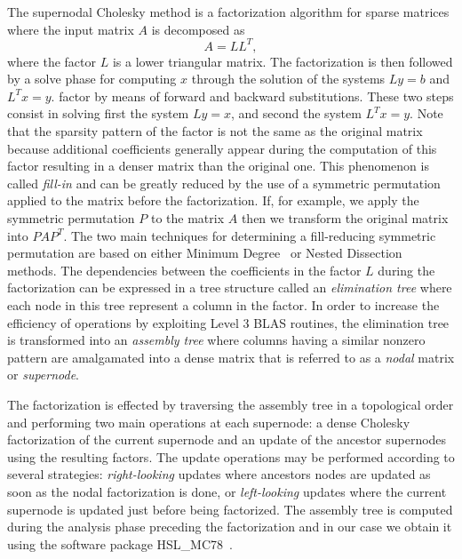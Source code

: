 \documentclass{article}
\begin{document}
The supernodal Cholesky method is a factorization algorithm for sparse
matrices where the input matrix $A$ is decomposed as
\begin{equation}\label{eq:chol}
  A = LL^{T},
\end{equation}
where the factor $L$ is a lower triangular matrix. The factorization
is then followed by a solve phase for computing $x$ through the solution
of the systems $Ly=b$ and $L^Tx=y$.
factor by means of forward and backward substitutions. These two steps
consist in solving first the system $Ly=x$, and second the system
$L^{T}x=y$. Note that the sparsity pattern of the factor is not the
same as the original matrix because additional coefficients
generally appear during the computation of this factor resulting in a
denser matrix than the original one. This phenomenon is called
\textit{fill-in} and can be greatly reduced by the use of a symmetric
permutation applied to the matrix before the factorization. If, for
example, we apply the symmetric permutation $P$ to the matrix $A$ then
we transform the original matrix into $PAP^{T}$. The two main
techniques for determining a fill-reducing symmetric permutation are
based on either Minimum Degree~\cite{t.w:67, l:85, a.d.d:96, a.d.d:04}
or Nested Dissection~\cite{g.l:78} methods. The dependencies between
the coefficients in the factor $L$ during the factorization can be
expressed in a tree structure called an \textit{elimination tree}
where each node in this tree represent a column in the factor. In
order to increase the efficiency of operations by exploiting Level 3
BLAS routines, the elimination tree is transformed into an
\textit{assembly tree} where columns having a similar nonzero pattern
are amalgamated into a dense matrix that is referred to as a
\textit{nodal} matrix or \textit{supernode}. 

The factorization is effected by traversing the assembly tree in a
topological order and performing two main operations at each
supernode: a dense Cholesky factorization of the current supernode and
an update of the ancestor supernodes using the resulting factors.
The update operations may be performed according
to several strategies: \textit{right-looking} updates where ancestors
nodes are updated as soon as the nodal factorization is done, or
\textit{left-looking} updates where the current supernode is updated
just before being factorized. The assembly tree is computed during the
analysis phase preceding the factorization and in our case we obtain
it using the software package HSL\_MC78~\cite{h.s:10}.
\end{document}
